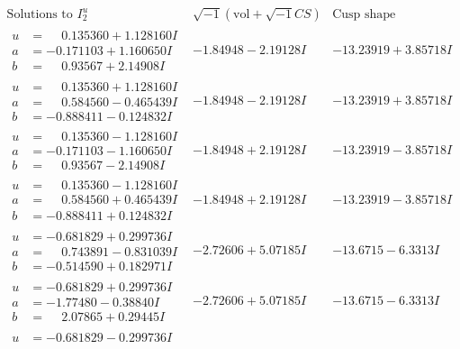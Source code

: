 \documentclass[1p]{elsarticle_modified}
\theoremstyle{definition}
\newcommand{\I}{\sqrt{-1}}
\begin{document}
$$\begin{array}{c|c|c}  
\text{Solutions to }I^u_{2}& \I (\text{vol} + \sqrt{-1}CS) & \text{Cusp shape}\\
 \hline 
\begin{aligned}
u &= \phantom{-}0.135360 + 1.128160 I \\
a &= -0.171103 + 1.160650 I \\
b &= \phantom{-}0.93567 + 2.14908 I\end{aligned}
 & -1.84948 - 2.19128 I & -13.23919 + 3.85718 I \\ \hline\begin{aligned}
u &= \phantom{-}0.135360 + 1.128160 I \\
a &= \phantom{-}0.584560 - 0.465439 I \\
b &= -0.888411 - 0.124832 I\end{aligned}
 & -1.84948 - 2.19128 I & -13.23919 + 3.85718 I \\ \hline\begin{aligned}
u &= \phantom{-}0.135360 - 1.128160 I \\
a &= -0.171103 - 1.160650 I \\
b &= \phantom{-}0.93567 - 2.14908 I\end{aligned}
 & -1.84948 + 2.19128 I & -13.23919 - 3.85718 I \\ \hline\begin{aligned}
u &= \phantom{-}0.135360 - 1.128160 I \\
a &= \phantom{-}0.584560 + 0.465439 I \\
b &= -0.888411 + 0.124832 I\end{aligned}
 & -1.84948 + 2.19128 I & -13.23919 - 3.85718 I \\ \hline\begin{aligned}
u &= -0.681829 + 0.299736 I \\
a &= \phantom{-}0.743891 - 0.831039 I \\
b &= -0.514590 + 0.182971 I\end{aligned}
 & -2.72606 + 5.07185 I & -13.6715 - 6.3313 I \\ \hline\begin{aligned}
u &= -0.681829 + 0.299736 I \\
a &= -1.77480 - 0.38840 I \\
b &= \phantom{-}2.07865 + 0.29445 I\end{aligned}
 & -2.72606 + 5.07185 I & -13.6715 - 6.3313 I \\ \hline\begin{aligned}
u &= -0.681829 - 0.299736 I \\

\end{aligned}
\end{array}$$
\end{document}
